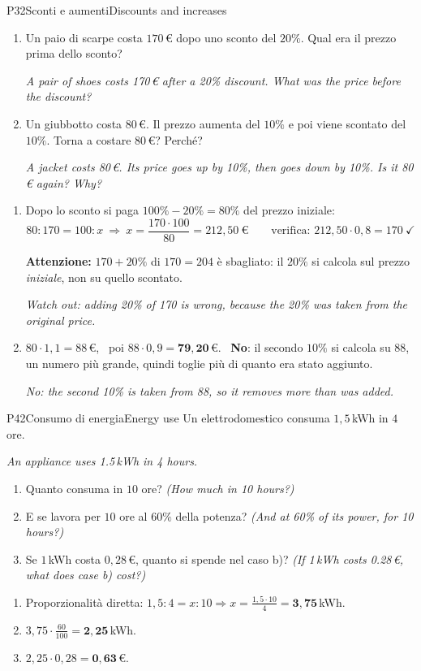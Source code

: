 \documentclass[11pt,a4paper]{article}
\newcommand{\en}[1]{\par{\small\itshape\color{engray}#1\par}}
\newcommand{\enx}[1]{{\small\itshape\color{engray}(#1)}}
\newcommand{\errore}[2]{\begin{attenzione}\textbf{\color{fgA}Attenzione:} #1\par
  {\itshape\color{engray}Watch out: #2}\end{attenzione}}
\begin{document}
\begin{esercizio}{P3}{2}{Sconti e aumenti}{Discounts and increases}
\begin{enumerate}
\item Un paio di scarpe costa $170$\,€ dopo uno sconto del $20\%$. Qual era il prezzo prima dello sconto?
\en{A pair of shoes costs 170\,€ after a 20\% discount. What was the price before the discount?}
\item Un giubbotto costa $80$\,€. Il prezzo aumenta del $10\%$ e poi viene scontato del $10\%$. Torna a costare $80$\,€? Perché?
\en{A jacket costs 80\,€. Its price goes up by 10\%, then goes down by 10\%. Is it 80\,€ again? Why?}
\end{enumerate}
\end{esercizio}
\begin{solbox}
\begin{enumerate}
\item Dopo lo sconto si paga $100\%-20\%=80\%$ del prezzo iniziale:
\[80:170=100:x\ \Rightarrow\ x=\frac{170\cdot100}{80}=\boxed{212,50\ \text{€}}\qquad\text{verifica: } 212,50\cdot0,8=170\ \checkmark\]
\errore{$170+20\%$ di $170=204$ è sbagliato: il $20\%$ si calcola sul prezzo \emph{iniziale}, non su quello scontato.}
{adding 20\% of 170 is wrong, because the 20\% was taken from the original price.}
\item $80\cdot1,1=88$\,€, \ poi $88\cdot0,9=\mathbf{79,20}$\,€. \ \textbf{No}: il secondo $10\%$ si calcola su $88$, un numero più grande, quindi toglie più di quanto era stato aggiunto.
\en{No: the second 10\% is taken from 88, so it removes more than was added.}
\end{enumerate}
\end{solbox}

\begin{esercizio}{P4}{2}{Consumo di energia}{Energy use}
Un elettrodomestico consuma $1,5$\,kWh in $4$ ore.
\en{An appliance uses 1.5\,kWh in 4 hours.}
\begin{enumerate}
\item Quanto consuma in $10$ ore? \enx{How much in 10 hours?}
\item E se lavora per $10$ ore al $60\%$ della potenza? \enx{And at 60\% of its power, for 10 hours?}
\item Se $1$\,kWh costa $0,28$\,€, quanto si spende nel caso b)? \enx{If 1\,kWh costs 0.28\,€, what does case b) cost?}
\end{enumerate}
\end{esercizio}
\begin{solbox}
\begin{enumerate}
\item Proporzionalità diretta: $1,5:4=x:10\Rightarrow x=\frac{1,5\cdot10}{4}=\mathbf{3,75}$\,kWh.
\item $3,75\cdot\frac{60}{100}=\mathbf{2,25}$\,kWh.
\item $2,25\cdot0,28=\mathbf{0,63}$\,€.
\end{enumerate}
\end{solbox}
\end{document}
